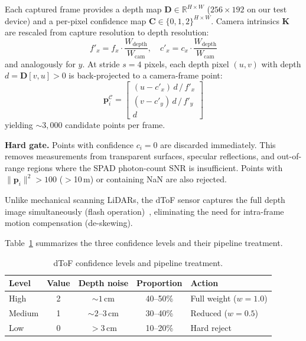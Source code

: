 Each captured frame provides a depth map $\mathbf{D} \in \mathbb{R}^{H \times W}$ ($256 \times 192$ on our test device) and a per-pixel confidence map $\mathbf{C} \in \{0,1,2\}^{H \times W}$.
Camera intrinsics $\mathbf{K}$ are rescaled from capture resolution to depth resolution:
\begin{equation}
    f'_x = f_x \cdot \frac{W_\text{depth}}{W_\text{cam}}, \quad
    c'_x = c_x \cdot \frac{W_\text{depth}}{W_\text{cam}}
    \label{eq:intrinsic_scale}
\end{equation}
and analogously for $y$.
At stride $s{=}4$ pixels, each depth pixel $(u,v)$ with depth $d = \mathbf{D}[v,u] > 0$ is back-projected to a camera-frame point:
\begin{equation}
    \mathbf{p}_i^{\mathcal{C}} = \begin{bmatrix}
        (u - c'_x)\,d\,/\,f'_x \\[2pt]
        (v - c'_y)\,d\,/\,f'_y \\[2pt]
        d
    \end{bmatrix}
    \label{eq:backproj}
\end{equation}
yielding ${\sim}3{,}000$ candidate points per frame.

\textbf{Hard gate.}
Points with confidence $c_i = 0$ are discarded immediately.
This removes measurements from transparent surfaces, specular reflections, and out-of-range regions where the SPAD photon-count SNR is insufficient.
Points with $\|\mathbf{p}_i\|^2 > 100$ ($>$10\,m) or containing NaN are also rejected.

Unlike mechanical scanning LiDARs, the dToF sensor captures the full depth image simultaneously (flash operation)~\cite{luetzenburg2021evaluation}, eliminating the need for intra-frame motion compensation (de-skewing).

Table~\ref{tab:confidence_levels} summarizes the three confidence levels and their pipeline treatment.

\begin{table}[t]
    \centering
    \caption{dToF confidence levels and pipeline treatment.}
    \label{tab:confidence_levels}
    \setlength{\tabcolsep}{3pt}
    \footnotesize
    \begin{tabular}{lcccl}
        \toprule
        Level & Value & Depth noise & Proportion & Action \\
        \midrule
        High   & 2 & ${\sim}1$\,cm   & 40--50\% & Full weight ($w{=}1.0$) \\
        Medium & 1 & ${\sim}2$--3\,cm & 30--40\% & Reduced ($w{=}0.5$) \\
        Low    & 0 & $>$3\,cm         & 10--20\% & Hard reject \\
        \bottomrule
    \end{tabular}
\end{table}

